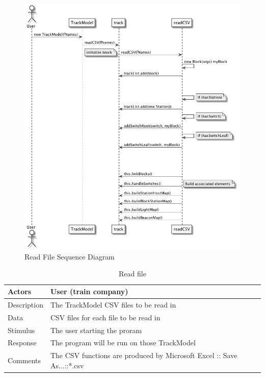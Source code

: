 \documentclass[]{article}
\begin{document}
\begin{figure}[H]
	\centering
	\includegraphics[scale=.5]{readFile.png}
	\caption{Read File Sequence Diagram}
\end{figure}

\begin{table}[H]
	\centering
	\caption{Read file}
	\begin{tabular}{|l|l|}
		\hline
		Actors & \parbox[t]{10cm}{User (train company)} \\ \hline
		Description & \parbox[t]{10cm}{The TrackModel CSV files to be read in} \\ \hline
		Data &  \parbox[t]{10cm}{CSV files for each file to be read in} \\ \hline
		Stimulus &  \parbox[t]{10cm}{The user starting the proram} \\ \hline
		Response & \parbox[t]{10cm}{The program will be run on those TrackModel}\\ \hline
		Comments & \parbox[t]{10cm}{The CSV functions are produced by Microsoft Excel :: Save As...::*.csv}  \\ \hline
	\end{tabular}
\end{table}
\end{document}
